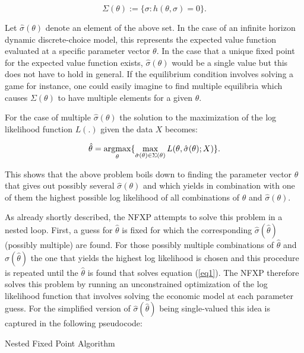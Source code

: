 \begin{equation*}
\Sigma(\theta) := \{\sigma:h(\theta, \sigma)=0\}.
\end{equation*}

Let $\hat{\sigma}(\theta)$ denote an element of the above set. In the case of an infinite horizon dynamic discrete-choice model, this represents the expected value function evaluated at a specific parameter vector $\theta$. In the case that a unique fixed point for the expected value function exists, $\hat{\sigma}(\theta)$ would be a single value but this does not have to hold in general. If the equilibrium condition involves solving a game for instance, one could easily imagine to find multiple equilibria which causes $\Sigma(\theta)$ to have multiple elements for a given $\theta$. 

For the case of multiple $\hat{\sigma}(\theta)$ the solution to the maximization of the log likelihood function $L(.)$ given the data $X$ becomes:

\begin{equation}
\hat\theta = \operatorname*{argmax}_{\theta} \{ \max_{\hat\sigma(\theta)\in\Sigma(\theta)} L(\theta,\hat\sigma(\theta); X)\}. \label{eq1}
\end{equation}

This shows that the above problem boils down to finding the parameter vector $\theta$ that gives out possibly several $\hat{\sigma}(\theta)$ and which yields in combination with one of them the highest possible log likelihood of all combinations of $\theta$ and $\hat{\sigma}(\theta)$.

As already shortly described, the NFXP attempts to solve this problem in a nested loop. First, a guess for $\hat{\theta}$ is fixed for which the corresponding $\hat{\sigma}(\hat\theta)$ (possibly multiple) are found. For those possibly multiple combinations of $\hat\theta$ and $\hat\sigma(\hat\theta)$ the one that yields the highest log likelihood is chosen and this procedure is repeated until the $\hat{\theta}$ is found that solves equation (\ref{eq1}). The NFXP therefore solves this problem by running an unconstrained optimization of the log likelihood function that involves solving the economic model at each parameter guess. For the simplified version of $\hat{\sigma}(\hat\theta)$ being single-valued this idea is captured in the following pseudocode:

\vspace{2ex}
\begin{algorithm}[H]
	\SetAlgoLined
	\caption{Nested Fixed Point Algorithm}
\end{algorithm}
\vspace{2ex}
 

